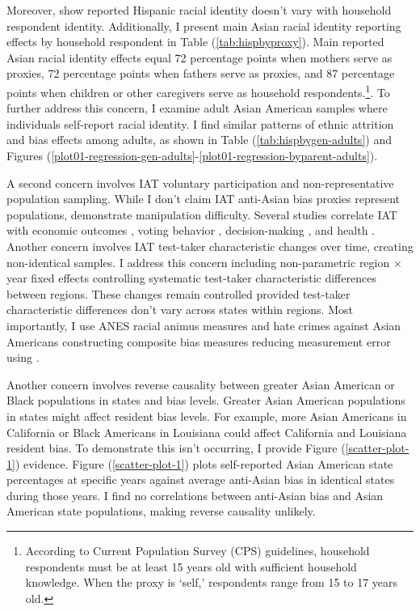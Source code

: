 Moreover, \textcite{duncanIntermarriageIntergenerationalTransmission2011} show reported Hispanic racial identity doesn't vary with household respondent identity. Additionally, I present main Asian racial identity reporting effects by household respondent in Table (\ref{tab:hispbyproxy}). Main reported Asian racial identity effects equal 72 percentage points when mothers serve as proxies, 72 percentage points when fathers serve as proxies, and 87 percentage points when children or other caregivers serve as household respondents.\footnote{According to Current Population Survey (CPS) guidelines, household respondents must be at least 15 years old with sufficient household knowledge. When the proxy is `self,' respondents range from 15 to 17 years old.}. To further address this concern, I examine adult Asian American samples where individuals self-report racial identity. I find similar patterns of ethnic attrition and bias effects among adults, as shown in Table (\ref{tab:hispbygen-adults}) and Figures (\ref{plot01-regression-gen-adults}-\ref{plot01-regression-byparent-adults}).

A second concern involves IAT voluntary participation and non-representative population sampling. While I don't claim IAT anti-Asian bias proxies represent populations, \textcite{egloffPredictiveValidityImplicit2002} demonstrate manipulation difficulty. Several studies correlate IAT with economic outcomes \autocite{chettyRaceEconomicOpportunity2020,gloverDiscriminationSelfFulfillingProphecy2017}, voting behavior \autocite{friesePredictingVotingBehavior2007}, decision-making \autocite{bertrandImplicitDiscrimination2005,carlanaImplicitStereotypesEvidence2019}, and health \autocite{leitnerRacialBiasAssociated2016}. Another concern involves IAT test-taker characteristic changes over time, creating non-identical samples. I address this concern including non-parametric region $\times$ year fixed effects controlling systematic test-taker characteristic differences between regions. These changes remain controlled provided test-taker characteristic differences don't vary across states within regions. Most importantly, I use ANES racial animus measures and hate crimes against Asian Americans constructing composite bias measures reducing measurement error using \textcite{lubotskyInterpretationRegressionsMultiple2006}.

Another concern involves reverse causality between greater Asian American or Black populations in states and bias levels. Greater Asian American populations in states might affect resident bias levels. For example, more Asian Americans in California or Black Americans in Louisiana could affect California and Louisiana resident bias. To demonstrate this isn't occurring, I provide Figure (\ref{scatter-plot-1}) evidence. Figure (\ref{scatter-plot-1}) plots self-reported Asian American state percentages at specific years against average anti-Asian bias in identical states during those years. I find no correlations between anti-Asian bias and Asian American state populations, making reverse causality unlikely.

